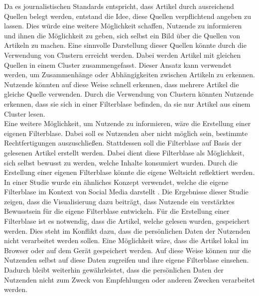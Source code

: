 Da es journalistischen Standards entspricht, dass Artikel durch ausreichend Quellen belegt werden, entstand die Idee, diese Quellen verpflichtend angeben zu lassen.
Dies würde eine weitere Möglichkeit schaffen, Nutzende zu informieren und ihnen die Möglichkeit zu geben, sich selbst ein Bild über die Quellen von Artikeln zu machen.
Eine sinnvolle Darstellung dieser Quellen könnte durch die Verwendung von Clustern erreicht werden.
Dabei werden Artikel mit gleichen Quellen in einem Cluster zusammengefasst.
Dieser Ansatz kann verwendet werden, um Zusammenhänge oder Abhängigkeiten zwischen Artikeln zu erkennen.
Nutzende könnten auf diese Weise schnell erkennen, dass mehrere Artikel die gleiche Quelle verwenden.
Durch die Verwendung von Clustern könnten Nutzende erkennen, dass sie sich in einer Filterblase befinden, da sie nur Artikel aus einem Cluster lesen. \\

Eine weitere Möglichkeit, um Nutzende zu informieren, wäre die Erstellung einer eigenen Filterblase.
Dabei soll es Nutzenden aber nicht möglich sein, bestimmte Rechtfertigungen auszuschließen.
Stattdessen soll die Filterblase auf Basis der gelesenen Artikel erstellt werden.
Dabei dient diese Filterblase als Möglichkeit, sich selbst bewusst zu werden, welche Inhalte konsumiert wurden.
Durch die Erstellung einer eigenen Filterblase könnte die eigene Weltsicht reflektiert werden.
In einer Studie wurde ein ähnliches Konzept verwendet, welche die eigene Filterblase im Kontext von Social Media darstellt \cite{social-media-bubble}.
Die Ergebnisse dieser Studie zeigen, dass die Visualisierung dazu beiträgt, dass Nutzende ein verstärktes Bewusstsein für die eigene Filterblase entwickeln.
Für die Erstellung einer Filterblase ist es notwendig, dass die Artikel, welche gelesen wurden, gespeichert werden.
Dies steht im Konflikt dazu, dass die persönlichen Daten der Nutzenden nicht verarbeitet werden sollen.
Eine Möglichkeit wäre, dass die Artikel lokal im Browser oder auf dem Gerät gespeichert werden.
Auf diese Weise können nur die Nutzenden selbst auf diese Daten zugreifen und ihre eigene Filterblase einsehen.
Dadurch bleibt weiterhin gewährleistet, dass die persönlichen Daten der Nutzenden nicht zum Zweck von Empfehlungen oder anderen Zwecken verarbeitet werden.\\
